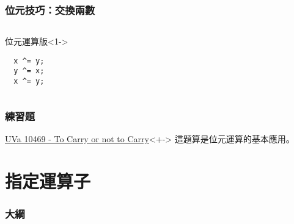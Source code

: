 \documentclass[utf8]{beamer}
\begin{document}
\begin{CJK}{UTF8}{bkai}
\begin{frame}[fragile]
  \frametitle{位元技巧：交換兩數}
  \begin{columns}[T]
    \begin{column}[T]{3.5cm}
    \begin{alertblock}{位元運算版}<1->
      \begin{lstlisting}
  x ^= y;
  y ^= x;
  x ^= y;
      \end{lstlisting}
    \end{alertblock}
    \end{column}
    \begin{column}[T]{7.5cm}
    \end{column}
  \end{columns}
\end{frame}

\begin{frame}
  \frametitle{練習題}
  \begin{exampleblock}{\href{http://unfortunate-dog.github.io/articles/104/p10469/}{UVa 10469 - To Carry or not to Carry}}<+->
  \label{uva:10469}
  這題算是位元運算的基本應用。
  \end{exampleblock}
\end{frame}

\section{指定運算子}
\begin{frame}
  \frametitle{大綱}
  \begin{multicols}{2}
    \tableofcontents[currentsection]
  \end{multicols}
\end{frame}


\end{CJK}
\end{document}
